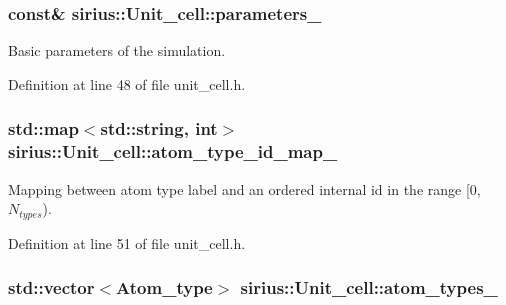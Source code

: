 \subsubsection[{parameters\+\_\+}]{ const\& sirius\+::\+Unit\+\_\+cell\+::parameters\+\_\+\hspace{0.3cm}{\ttfamily [private]}}\label{classsirius_1_1_unit__cell_aa6ab9c74c7627f62ce1073eba5a47eb3}


Basic parameters of the simulation. 



Definition at line 48 of file unit\+\_\+cell.\+h.

\hypertarget{classsirius_1_1_unit__cell_a30a032f0eef70ee7833dfc428f139abb}{}
\subsubsection[{atom\+\_\+type\+\_\+id\+\_\+map\+\_\+}]{\setlength{\rightskip}{0pt plus 5cm}std\+::map$<$std\+::string, int$>$ sirius\+::\+Unit\+\_\+cell\+::atom\+\_\+type\+\_\+id\+\_\+map\+\_\+\hspace{0.3cm}{\ttfamily [private]}}\label{classsirius_1_1_unit__cell_a30a032f0eef70ee7833dfc428f139abb}


Mapping between atom type label and an ordered internal id in the range \mbox{[}0, $ N_{types} $). 



Definition at line 51 of file unit\+\_\+cell.\+h.

\hypertarget{classsirius_1_1_unit__cell_a632c9f18c76754036b15c319781a3a11}{}
\subsubsection[{atom\+\_\+types\+\_\+}]{\setlength{\rightskip}{0pt plus 5cm}std\+::vector$<${\bf Atom\+\_\+type}$>$ sirius\+::\+Unit\+\_\+cell\+::atom\+\_\+types\+\_\+\hspace{0.3cm}{\ttfamily [private]}}\label{classsirius_1_1_unit__cell_a632c9f18c76754036b15c319781a3a11}


